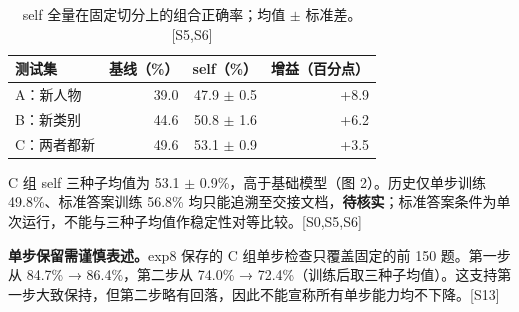 \documentclass[11pt,a4paper]{article}
\newcommand{\src}[1]{{\scriptsize\color{ink}[#1]}}
\begin{document}
\begin{table}[h]\centering\small
\caption{self 全量在固定切分上的组合正确率；均值 $\pm$ 标准差。\src{S5,S6}}
\begin{tabular}{lrrr}\toprule
测试集 & 基线（\%） & self（\%） & 增益（百分点）\\\midrule
A：新人物 & 39.0 & 47.9 $\pm$ 0.5 & +8.9 \\
B：新类别 & 44.6 & 50.8 $\pm$ 1.6 & +6.2 \\
C：两者都新 & 49.6 & 53.1 $\pm$ 0.9 & +3.5 \\
\bottomrule\end{tabular}\end{table}
C 组 self 三种子均值为 53.1 $\pm$ 0.9\%，高于基础模型（图 2）。历史仅单步训练 49.8\%、标准答案训练 56.8\% 均只能追溯至交接文档，\textbf{待核实}；标准答案条件为单次运行，不能与三种子均值作稳定性对等比较。\src{S0,S5,S6}

\textbf{单步保留需谨慎表述。}exp8 保存的 C 组单步检查只覆盖固定的前 150 题。第一步从 84.7\% → 86.4\%，第二步从 74.0\% → 72.4\%（训练后取三种子均值）。这支持第一步大致保持，但第二步略有回落，因此不能宣称所有单步能力均不下降。\src{S13}
\end{document}
